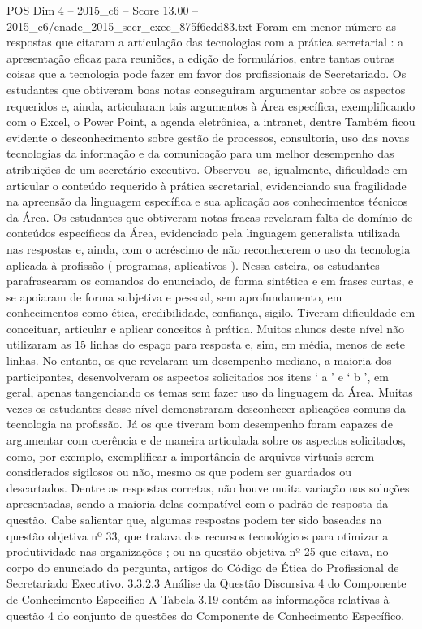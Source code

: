 \begin{textsample}{POS Dim 4 – 2015\_c6 – Score 13.00 – 2015\_c6/enade\_2015\_secr\_exec\_875f6cdd83.txt}
Foram em menor número as respostas que citaram a articulação das tecnologias com a prática secretarial : a apresentação eficaz para reuniões, a edição de formulários, entre tantas outras coisas que a tecnologia pode fazer em favor dos profissionais de Secretariado.
Os estudantes que obtiveram boas notas conseguiram argumentar sobre os aspectos requeridos e, ainda, articularam tais argumentos à Área específica, exemplificando com o Excel, o Power Point, a agenda eletrônica, a intranet, dentre Também ficou evidente o desconhecimento sobre gestão de processos, consultoria, uso das novas tecnologias da informação e da comunicação para um melhor desempenho das atribuições de um secretário executivo.
Observou -se, igualmente, dificuldade em articular o conteúdo requerido à prática secretarial, evidenciando sua fragilidade na apreensão da linguagem específica e sua aplicação aos conhecimentos técnicos da Área.
Os estudantes que obtiveram notas fracas revelaram falta de domínio de conteúdos específicos da Área, evidenciado pela linguagem generalista utilizada nas respostas e, ainda, com o acréscimo de não reconhecerem o uso da tecnologia aplicada à profissão ( programas, aplicativos ).
Nessa esteira, os estudantes parafrasearam os comandos do enunciado, de forma sintética e em frases curtas, e se apoiaram de forma subjetiva e pessoal, sem aprofundamento, em conhecimentos como ética, credibilidade, confiança, sigilo.
Tiveram dificuldade em conceituar, articular e aplicar conceitos à prática.
Muitos alunos deste nível não utilizaram as 15 linhas do espaço para resposta e, sim, em média, menos de sete linhas.
No entanto, os que revelaram um desempenho mediano, a maioria dos participantes, desenvolveram os aspectos solicitados nos itens ‘ a ’ e ‘ b ’, em geral, apenas tangenciando os temas sem fazer uso da linguagem da Área.
Muitas vezes os estudantes desse nível demonstraram desconhecer aplicações comuns da tecnologia na profissão.
Já os que tiveram bom desempenho foram capazes de argumentar com coerência e de maneira articulada sobre os aspectos solicitados, como, por exemplo, exemplificar a importância de arquivos virtuais serem considerados sigilosos ou não, mesmo os que podem ser guardados ou descartados.
Dentre as respostas corretas, não houve muita variação nas soluções apresentadas, sendo a maioria delas compatível com o padrão de resposta da questão.
Cabe salientar que, algumas respostas podem ter sido baseadas na questão objetiva nº 33, que tratava dos recursos tecnológicos para otimizar a produtividade nas organizações ; ou na questão objetiva nº 25 que citava, no corpo do enunciado da pergunta, artigos do Código de Ética do Profissional de Secretariado Executivo. 3.3.2.3 Análise da Questão Discursiva 4 do Componente de Conhecimento Específico A Tabela 3.19 contém as informações relativas à questão 4 do conjunto de questões do Componente de Conhecimento Específico.

\end{textsample}
